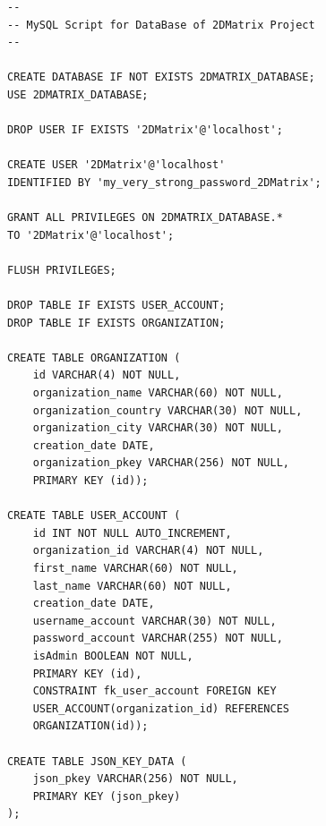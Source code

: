 \begin{verbatim}
--
-- MySQL Script for DataBase of 2DMatrix Project
-- 

CREATE DATABASE IF NOT EXISTS 2DMATRIX_DATABASE;
USE 2DMATRIX_DATABASE;

DROP USER IF EXISTS '2DMatrix'@'localhost';

CREATE USER '2DMatrix'@'localhost' 
IDENTIFIED BY 'my_very_strong_password_2DMatrix';

GRANT ALL PRIVILEGES ON 2DMATRIX_DATABASE.* 
TO '2DMatrix'@'localhost';

FLUSH PRIVILEGES;

DROP TABLE IF EXISTS USER_ACCOUNT;
DROP TABLE IF EXISTS ORGANIZATION;

CREATE TABLE ORGANIZATION (
    id VARCHAR(4) NOT NULL,
    organization_name VARCHAR(60) NOT NULL,
    organization_country VARCHAR(30) NOT NULL,
    organization_city VARCHAR(30) NOT NULL,
    creation_date DATE,
    organization_pkey VARCHAR(256) NOT NULL,
    PRIMARY KEY (id));

CREATE TABLE USER_ACCOUNT (
    id INT NOT NULL AUTO_INCREMENT,
    organization_id VARCHAR(4) NOT NULL,
    first_name VARCHAR(60) NOT NULL,
    last_name VARCHAR(60) NOT NULL,
    creation_date DATE,
    username_account VARCHAR(30) NOT NULL,
    password_account VARCHAR(255) NOT NULL,
    isAdmin BOOLEAN NOT NULL,
    PRIMARY KEY (id),
    CONSTRAINT fk_user_account FOREIGN KEY
    USER_ACCOUNT(organization_id) REFERENCES
    ORGANIZATION(id));

CREATE TABLE JSON_KEY_DATA (
    json_pkey VARCHAR(256) NOT NULL,
    PRIMARY KEY (json_pkey)
);
\end{verbatim}